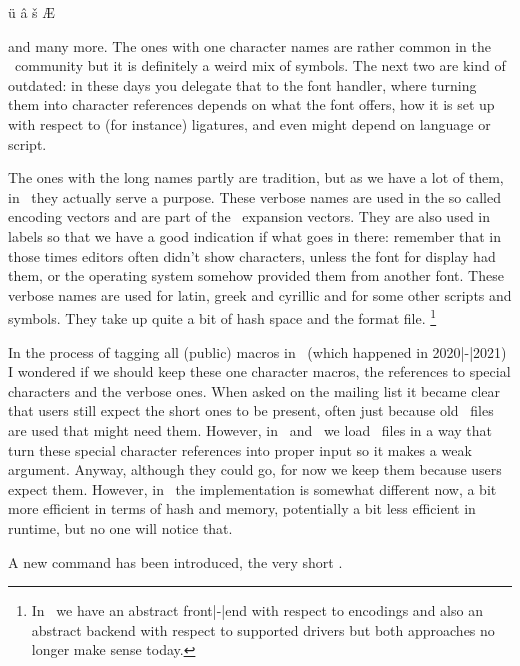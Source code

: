 \starttyping[option=TEX]
\"u \^a \v{s} \AE \ij \eacute \oslash
\stoptyping

and many more. The ones with one character names are rather common in the \TEX\
community but it is definitely a weird mix of symbols. The next two are kind of
outdated: in these days you delegate that to the font handler, where turning them
into \quote {single} character references depends on what the font offers, how it
is set up with respect to (for instance) ligatures, and even might depend on
language or script.

The ones with the long names partly are tradition, but as we have a lot of them,
in \MKII\ they actually serve a purpose. These verbose names are used in the so
called encoding vectors and are part of the \UTF\ expansion vectors. They are
also used in labels so that we have a good indication if what goes in there:
remember that in those times editors often didn't show characters, unless the
font for display had them, or the operating system somehow provided them from
another font. These verbose names are used for latin, greek and cyrillic and for
some other scripts and symbols. They take up quite a bit of hash space and the
format file. \footnote {In \MKII\ we have an abstract front|-|end with respect to
encodings and also an abstract backend with respect to supported drivers but both
approaches no longer make sense today.}

\stopsection

\startsection[title=The \LMTX\ approach]

In the process of tagging all (public) macros in \LMTX\ (which happened in
2020|-|2021) I wondered if we should keep these one character macros, the
references to special characters and the verbose ones. When asked on the mailing
list it became clear that users still expect the short ones to be present, often
just because old \BIBTEX\ files are used that might need them. However, in \MKIV\
and \LMTX\ we load \BIBTEX\ files in a way that turn these special character
references into proper \UTF8 input so it makes a weak argument. Anyway, although
they could go, for now we keep them because users expect them. However, in \LMTX\
the implementation is somewhat different now, a bit more efficient in terms of
hash and memory, potentially a bit less efficient in runtime, but no one will
notice that.

A new command has been introduced, the very short \type {\chr}.

\startbuffer
\chr {à} \chr {á} \chr {ä}
  
  
\chr {aacute}  \chr {agrave}  
\stopbuffer

